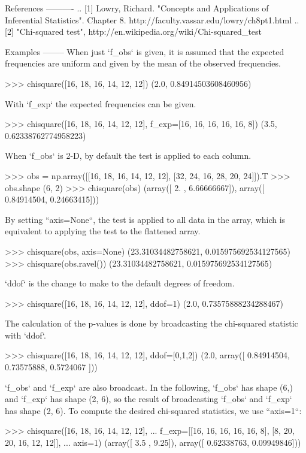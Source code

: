 \begin{DoxyVerb}
References
----------
.. [1] Lowry, Richard.  "Concepts and Applications of Inferential
       Statistics". Chapter 8. http://faculty.vassar.edu/lowry/ch8pt1.html
.. [2] "Chi-squared test", http://en.wikipedia.org/wiki/Chi-squared_test

Examples
--------
When just `f_obs` is given, it is assumed that the expected frequencies
are uniform and given by the mean of the observed frequencies.

>>> chisquare([16, 18, 16, 14, 12, 12])
(2.0, 0.84914503608460956)

With `f_exp` the expected frequencies can be given.

>>> chisquare([16, 18, 16, 14, 12, 12], f_exp=[16, 16, 16, 16, 16, 8])
(3.5, 0.62338762774958223)

When `f_obs` is 2-D, by default the test is applied to each column.

>>> obs = np.array([[16, 18, 16, 14, 12, 12], [32, 24, 16, 28, 20, 24]]).T
>>> obs.shape
(6, 2)
>>> chisquare(obs)
(array([ 2.        ,  6.66666667]), array([ 0.84914504,  0.24663415]))

By setting ``axis=None``, the test is applied to all data in the array,
which is equivalent to applying the test to the flattened array.

>>> chisquare(obs, axis=None)
(23.31034482758621, 0.015975692534127565)
>>> chisquare(obs.ravel())
(23.31034482758621, 0.015975692534127565)

`ddof` is the change to make to the default degrees of freedom.

>>> chisquare([16, 18, 16, 14, 12, 12], ddof=1)
(2.0, 0.73575888234288467)

The calculation of the p-values is done by broadcasting the
chi-squared statistic with `ddof`.

>>> chisquare([16, 18, 16, 14, 12, 12], ddof=[0,1,2])
(2.0, array([ 0.84914504,  0.73575888,  0.5724067 ]))

`f_obs` and `f_exp` are also broadcast.  In the following, `f_obs` has
shape (6,) and `f_exp` has shape (2, 6), so the result of broadcasting
`f_obs` and `f_exp` has shape (2, 6).  To compute the desired chi-squared
statistics, we use ``axis=1``:

>>> chisquare([16, 18, 16, 14, 12, 12],
...           f_exp=[[16, 16, 16, 16, 16, 8], [8, 20, 20, 16, 12, 12]],
...           axis=1)
(array([ 3.5 ,  9.25]), array([ 0.62338763,  0.09949846]))\end{DoxyVerb}
 \hypertarget{namespacescipy_1_1stats_1_1stats_a4fa11e21b0bc19cae7fc92d8a4960462}{}
